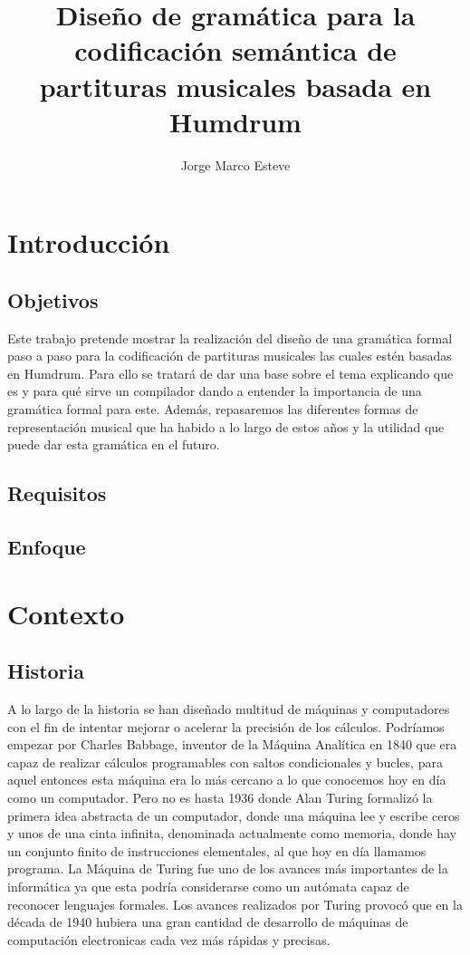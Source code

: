 \documentclass{article}
\title{Diseño de gramática para la codificación semántica de partituras musicales basada en Humdrum}
\author{Jorge Marco Esteve}
\begin{document}
    \maketitle

    \section{Introducción}
    \subsection{Objetivos}
    Este trabajo pretende mostrar la realización del diseño de una gramática formal paso a paso para la codificación
    de partituras musicales las cuales estén basadas en Humdrum.
    Para ello se tratará de dar una base sobre el tema explicando que es y para qué sirve un compilador dando a entender
    la importancia de una gramática formal para este. Además, repasaremos las diferentes formas de representación musical
    que ha habido a lo largo de estos años y la utilidad que puede dar esta gramática en el futuro.
    \subsection{Requisitos}

    \subsection{Enfoque}



    \section{Contexto}
    \subsection{Historia}
    A lo largo de la historia se han diseñado multitud de máquinas y computadores con el fin de intentar mejorar o acelerar
    la precisión de los cálculos. Podríamos empezar por Charles Babbage\cite{babbage}, inventor de la Máquina Analítica en 1840 que era capaz
    de realizar cálculos programables con saltos condicionales y bucles, para aquel entonces esta máquina era lo más cercano
    a lo que conocemos hoy en día como un computador. Pero no es hasta 1936 donde Alan Turing formalizó la primera idea
    abstracta de un computador, donde una máquina lee y escribe ceros y unos de una cinta infinita, denominada actualmente
    como memoria, donde hay un conjunto finito de instrucciones elementales, al que hoy en día llamamos programa. La Máquina
    de Turing fue uno de los avances más importantes de la informática ya que esta podría considerarse como un autómata
    capaz de reconocer lenguajes formales. Los avances realizados por Turing provocó que en la década de 1940 hubiera una
    gran cantidad de desarrollo de máquinas de computación electronicas cada vez más rápidas y precisas.
\end{document}
